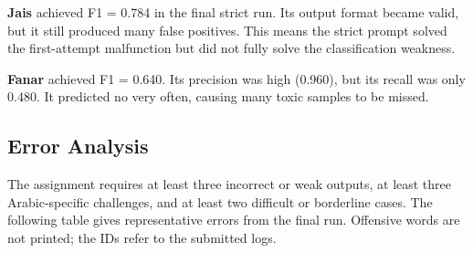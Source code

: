 \textbf{Jais} achieved F1 = 0.784 in the final strict run. Its output format became valid, but it still produced many false positives. This means the strict prompt solved the first-attempt malfunction but did not fully solve the classification weakness.

\textbf{Fanar} achieved F1 = 0.640. Its precision was high (0.960), but its recall was only 0.480. It predicted no very often, causing many toxic samples to be missed.

\subsection{Error Analysis}
The assignment requires at least three incorrect or weak outputs, at least three Arabic-specific challenges, and at least two difficult or borderline cases. The following table gives representative errors from the final run. Offensive words are not printed; the IDs refer to the submitted logs.

